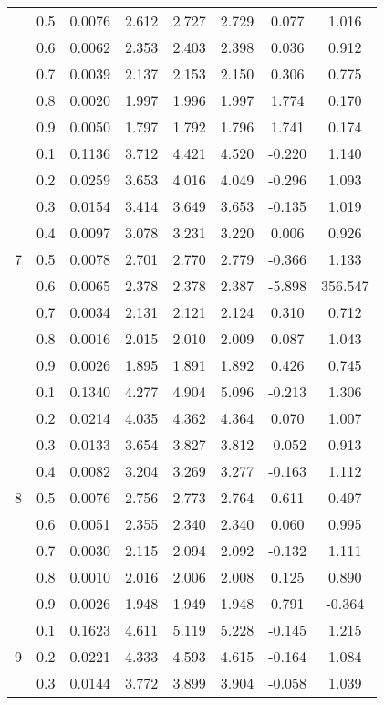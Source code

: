 \documentclass[11pt,a4paper]{report}
\begin{document}
\begin{longtable}{ | c | c || c | c | c | c | c | c | }
 & 0.5 & 0.0076 & 2.612 & 2.727 & 2.729 & 0.077 & 1.016 \\
 & 0.6 & 0.0062 & 2.353 & 2.403 & 2.398 & 0.036 & 0.912 \\
 & 0.7 & 0.0039 & 2.137 & 2.153 & 2.150 & 0.306 & 0.775 \\
 & 0.8 & 0.0020 & 1.997 & 1.996 & 1.997 & 1.774 & 0.170 \\
 & 0.9 & 0.0050 & 1.797 & 1.792 & 1.796 & 1.741 & 0.174 \\
 \hline
\multirow{9}{*}{7} & 0.1 & 0.1136 & 3.712 & 4.421 & 4.520 & -0.220 & 1.140 \\
 & 0.2 & 0.0259 & 3.653 & 4.016 & 4.049 & -0.296 & 1.093 \\
 & 0.3 & 0.0154 & 3.414 & 3.649 & 3.653 & -0.135 & 1.019 \\
 & 0.4 & 0.0097 & 3.078 & 3.231 & 3.220 & 0.006 & 0.926 \\
 & 0.5 & 0.0078 & 2.701 & 2.770 & 2.779 & -0.366 & 1.133 \\
 & 0.6 & 0.0065 & 2.378 & 2.378 & 2.387 & -5.898 & 356.547 \\
 & 0.7 & 0.0034 & 2.131 & 2.121 & 2.124 & 0.310 & 0.712 \\
 & 0.8 & 0.0016 & 2.015 & 2.010 & 2.009 & 0.087 & 1.043 \\
 & 0.9 & 0.0026 & 1.895 & 1.891 & 1.892 & 0.426 & 0.745 \\
 \hline
\multirow{9}{*}{8} & 0.1 & 0.1340 & 4.277 & 4.904 & 5.096 & -0.213 & 1.306 \\
 & 0.2 & 0.0214 & 4.035 & 4.362 & 4.364 & 0.070 & 1.007 \\
 & 0.3 & 0.0133 & 3.654 & 3.827 & 3.812 & -0.052 & 0.913 \\
 & 0.4 & 0.0082 & 3.204 & 3.269 & 3.277 & -0.163 & 1.112 \\
 & 0.5 & 0.0076 & 2.756 & 2.773 & 2.764 & 0.611 & 0.497 \\
 & 0.6 & 0.0051 & 2.355 & 2.340 & 2.340 & 0.060 & 0.995 \\
 & 0.7 & 0.0030 & 2.115 & 2.094 & 2.092 & -0.132 & 1.111 \\
 & 0.8 & 0.0010 & 2.016 & 2.006 & 2.008 & 0.125 & 0.890 \\
 & 0.9 & 0.0026 & 1.948 & 1.949 & 1.948 & 0.791 & -0.364 \\
 \hline
\multirow{9}{*}{9} & 0.1 & 0.1623 & 4.611 & 5.119 & 5.228 & -0.145 & 1.215 \\
 & 0.2 & 0.0221 & 4.333 & 4.593 & 4.615 & -0.164 & 1.084 \\
 & 0.3 & 0.0144 & 3.772 & 3.899 & 3.904 & -0.058 & 1.039 \\

\end{longtable}
\end{document}

